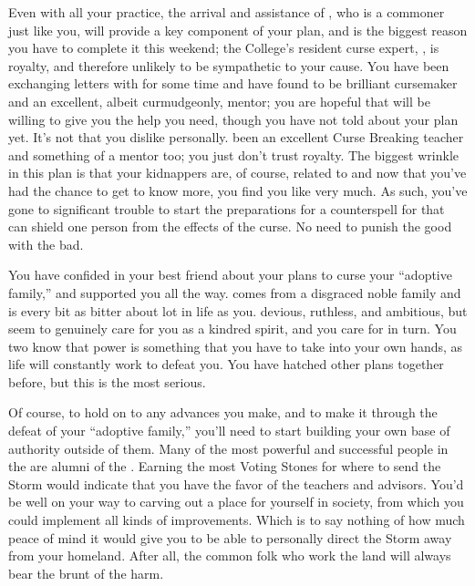 \documentclass[char]{GL2020}
\begin{document}
Even with all your practice, the arrival and assistance of \cCurse{\full}, who is a commoner just like you, will provide a key component of your plan, and is the biggest reason you have to complete it this weekend; the College's resident curse expert, \cPrince{\Heir} \cPrince{}, is \pFarm{} royalty, and therefore unlikely to be sympathetic to your cause. You have been exchanging letters with \cCurse{} for some time and have found \cCurse{\them} to be brilliant cursemaker and an excellent, albeit curmudgeonly, mentor; you are hopeful that \cCurse{\they} will be willing to give you the help you need, though you have not told \cCurse{\them} about your plan yet. It's not that you dislike \cPrince{} personally. \cPrince{\Theyhave} been an excellent Curse Breaking teacher and something of a mentor too; you just don't trust royalty. The biggest wrinkle in this plan is that your kidnappers are, of course, related to \cMusic{} and now that you've had the chance to get to know \cMusic{\them} more, you find you like \cMusic{\them} very much. As such, you've gone to significant trouble to start the preparations for a counterspell for \cMusic{\them} that can shield one person from the effects of the curse. No need to punish the good with the bad.

You have confided in your best friend \cLibAssist{\full} about your plans to curse your “adoptive family,” and \cLibAssist{\theyhave} supported you all the way. \cLibAssist{} comes from a disgraced noble family and is every bit as bitter about \cLibAssist{\their} lot in life as you.  \cLibAssist{\Theyare} devious, ruthless, and ambitious, but seem\cLibAssist{\verbs} to genuinely care for you as a kindred spirit, and you care for \cLibAssist{\them} in turn. You two know that power is something that you have to take into your own hands, as life will constantly work to defeat you. You have hatched other plans together before, but this is the most serious.  

Of course, to hold on to any advances you make, and to make it through the defeat of your ``adoptive family,'' you'll need to start building your own base of authority outside of them. Many of the most powerful and successful people in the \pFarm{} are alumni of the \pSchool{}. Earning the most Voting Stones for where to send the Storm would indicate that you have the favor of the teachers and advisors. You'd be well on your way to carving out a place for yourself in \pFarm{} society, from which you could implement all kinds of improvements. Which is to say nothing of how much peace of mind it would give you to be able to personally direct the Storm away from your homeland. After all, the common folk who work the land will always bear the brunt of the harm.
\end{document}
